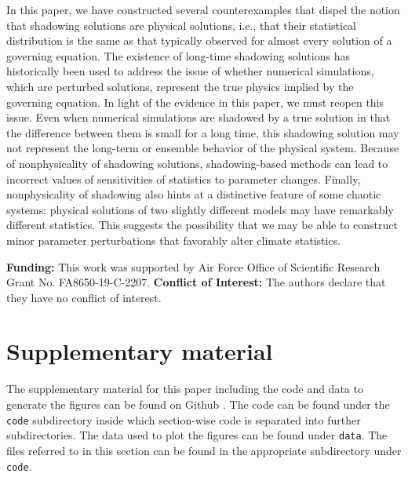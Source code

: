 \documentclass[preprint,12pt]{elsarticle}
\begin{document}
In this paper, we have constructed several counterexamples that 
dispel the notion that shadowing solutions are physical solutions, i.e., that their 
statistical distribution is the same as that typically observed for almost every solution 
of a governing equation. The existence of long-time shadowing solutions \cite{grebogi} has historically been used to address the issue of whether numerical simulations, which are 
perturbed solutions, represent the true physics implied by the governing equation. In light of the evidence in this paper, we must reopen this issue. Even when numerical simulations are 
shadowed by a true solution in that the difference between them is small for a long time, this shadowing solution may not represent the long-term or ensemble behavior of the physical system. Because of nonphysicality of shadowing solutions, shadowing-based methods can lead to incorrect values of sensitivities of statistics to parameter changes. Finally, nonphysicality of shadowing also hints at a distinctive feature of some chaotic systems: physical solutions of two slightly different models may have remarkably different statistics. This suggests the possibility that we may be able to construct minor parameter perturbations that favorably alter climate statistics.   
\vspace{1in}

\textbf{Funding:} This work was supported by Air Force Office of Scientific Research Grant No. FA8650-19-C-2207.
\textbf{Conflict of Interest:} The authors declare that they have no conflict of interest.



 

\section{Supplementary material}
\label{sec:supp}
The supplementary material for this paper including the code and data to generate the figures can be found on Github \cite{supp}. The code can be found under the \verb+code+ subdirectory inside which section-wise code is separated into further subdirectories. The data used to plot the figures can be found under \verb+data+. The files referred to in this section can be found in the appropriate subdirectory under \verb+code+. 
\end{document}
